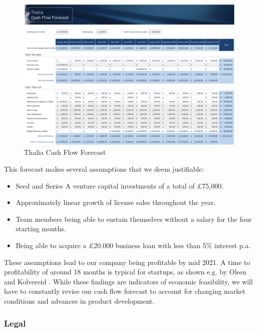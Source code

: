 \documentclass[main.tex]{subfiles}
\begin{document}
\begin{figure}[H]
    \caption{Thalia Cash Flow Forecast}
	\includegraphics[width=\textwidth]{03Requirements/03Pictures/cash_flow_forecast.png}
\end{figure}

This forecast makes several assumptions that we deem justifiable:

\begin{itemize}
    \item Seed and Series A venture capital investments of a total of £75,000.
    \item Approximately linear growth of license sales throughout the year.
    \item Team members being able to sustain themselves without a salary for the four starting months.
    \item Being able to acquire a £20.000 business loan with less than 5\% interest p.a.
\end{itemize}

These assumptions lead to our company being profitable by mid 2021. A time to profitability of around 18 months is typical for startups, as shown e.g. by Olsen and Kolvereid \cite{startup_profitability}. While these findings are indicators of economic feasibility, we will have to constantly revise our cash flow forecast to account for changing market conditions and advances in product development.

\subsubsection{Legal}
\end{document}
